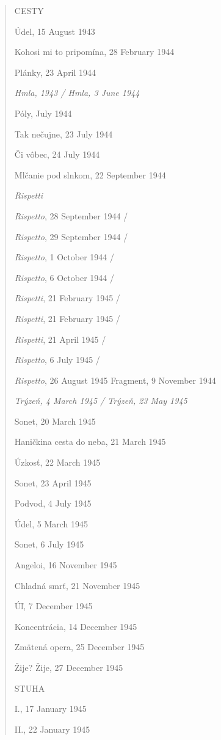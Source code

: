\documentclass{article}
\begin{document}
\begin{quote}
CESTY

Údel, 15 August 1943

Kohosi mi to pripomína, 28 February 1944

Plánky, 23 April 1944

\emph{Hmla, 1943 / Hmla, 3 June 1944}

Póly, July 1944

Tak nečujne, 23 July 1944

Či vôbec, 24 July 1944

Mlčanie pod slnkom, 22 September 1944

\emph{Rispetti}

\setlength\parindent{14pt} \emph{Rispetto}, 28 September 1944 /

\emph{Rispetto}, 29 September 1944 /

\emph{Rispetto}, 1 October 1944 /

\emph{Rispetto}, 6 October 1944 /

\emph{Rispetti}, 21 February 1945 /

\emph{Rispetti}, 21 February 1945 /

\emph{Rispetti}, 21 April 1945 /

\emph{Rispetto}, 6 July 1945 /

\emph{Rispetto}, 26 August 1945
\setlength\parindent{0pt}
Fragment, 9 November 1944

\emph{Trýzeň, 4 March 1945 / Trýzeň, 23 May 1945}

Sonet, 20 March 1945

Haničkina cesta do neba, 21 March 1945

Úzkosť, 22 March 1945

Sonet, 23 April 1945

Podvod, 4 July 1945

Údel, 5 March 1945

Sonet, 6 July 1945

Angeloi, 16 November 1945

Chladná smrť, 21 November 1945

Úľ, 7 December 1945

Koncentrácia, 14 December 1945

Zmätená opera, 25 December 1945

Žije? Žije, 27 December 1945

\hfill

STUHA

I., 17 January 1945

II., 22 January 1945


\end{quote}
\end{document}
